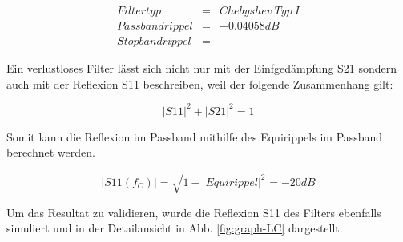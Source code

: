 \begin{mdframed}
\begin{equation*} 
\begin{array}{rclcl} 
Filtertyp & = & Chebyshev\ Typ\ I\\
Passbandrippel & = & -0.04058 dB \\ 
Stopbandrippel & = & - 
\end{array} 
\end{equation*} 
\end{mdframed}

\newpage
Ein verlustloses Filter lässt sich nicht nur mit der Einfgedämpfung S21 sondern auch mit der Reflexion S11 beschreiben, weil der folgende Zusammenhang gilt:

\begin{equation}
{|S11|}^2 + {|S21|}^2 = 1
\end{equation}

Somit kann die Reflexion im Passband mithilfe des Equirippels im Passband berechnet werden.

\begin{equation}
|S11(f_C)| = \sqrt{1-{|Equirippel|}^2} = -20 dB
\end{equation}

Um das Resultat zu validieren, wurde die Reflexion S11 des Filters ebenfalls simuliert und in der Detailansicht in  Abb. \ref{fig:graph-LC} dargestellt.



















